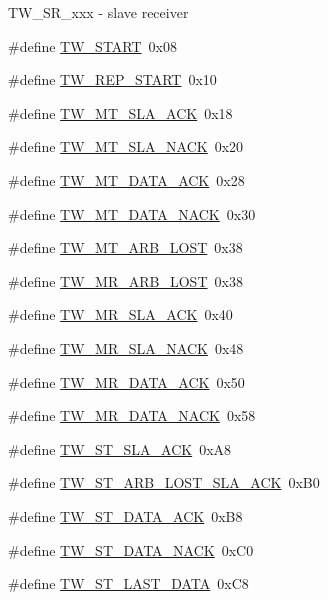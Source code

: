 TW\_\-SR\_\-xxx -\/ slave receiver \begin{DoxyCompactItemize}
\item 
\#define \hyperlink{group__util__twi_ga8ec630c2063d0353c53d140b99382d80}{TW\_\-START}~0x08
\item 
\#define \hyperlink{group__util__twi_ga8dce3e4b7e35355a8add9ed63d1fa3ab}{TW\_\-REP\_\-START}~0x10
\item 
\#define \hyperlink{group__util__twi_ga85cae14b4190042335d25ed9a1b72369}{TW\_\-MT\_\-SLA\_\-ACK}~0x18
\item 
\#define \hyperlink{group__util__twi_gaca64b973c51d6548a962c1d7cae0663e}{TW\_\-MT\_\-SLA\_\-NACK}~0x20
\item 
\#define \hyperlink{group__util__twi_ga4c28186053b5298305b131ad3e1111f7}{TW\_\-MT\_\-DATA\_\-ACK}~0x28
\item 
\#define \hyperlink{group__util__twi_ga91c107a74d268f8578d866ed1bbbd4f3}{TW\_\-MT\_\-DATA\_\-NACK}~0x30
\item 
\#define \hyperlink{group__util__twi_ga5959251c4bd80f48b5a029447d86adb3}{TW\_\-MT\_\-ARB\_\-LOST}~0x38
\item 
\#define \hyperlink{group__util__twi_gad85222308836bfbe099255662ffb510c}{TW\_\-MR\_\-ARB\_\-LOST}~0x38
\item 
\#define \hyperlink{group__util__twi_gac16504b87d15d83b97bb0ce61577bb40}{TW\_\-MR\_\-SLA\_\-ACK}~0x40
\item 
\#define \hyperlink{group__util__twi_ga655325b6f8a1818103b126cc3774d8e8}{TW\_\-MR\_\-SLA\_\-NACK}~0x48
\item 
\#define \hyperlink{group__util__twi_ga3c8c79b2ecb8d22358839890161cc33b}{TW\_\-MR\_\-DATA\_\-ACK}~0x50
\item 
\#define \hyperlink{group__util__twi_ga532f0ffa12f684346c74a5cbec15950e}{TW\_\-MR\_\-DATA\_\-NACK}~0x58
\item 
\#define \hyperlink{group__util__twi_ga0ecd2ca38d00279194460e65028a0533}{TW\_\-ST\_\-SLA\_\-ACK}~0xA8
\item 
\#define \hyperlink{group__util__twi_ga1064659d0758206d43d69cd582d1f5da}{TW\_\-ST\_\-ARB\_\-LOST\_\-SLA\_\-ACK}~0xB0
\item 
\#define \hyperlink{group__util__twi_ga2de84bf7cbf1cd7ae43a6e0f0eeca719}{TW\_\-ST\_\-DATA\_\-ACK}~0xB8
\item 
\#define \hyperlink{group__util__twi_gacc1837317b1d45e9bb49b8e83cfe6d42}{TW\_\-ST\_\-DATA\_\-NACK}~0xC0
\item 
\#define \hyperlink{group__util__twi_gaf92d03d0051d47f5b9375f0ef9293d64}{TW\_\-ST\_\-LAST\_\-DATA}~0xC8

\end{DoxyCompactItemize}
